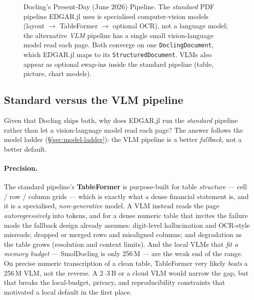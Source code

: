 \documentclass[11pt,a4paper]{report}
\begin{document}
\begin{figure}[th]
\caption{Docling's Present-Day (June 2026) Pipeline. The \emph{standard} PDF pipeline EDGAR.jl uses is
specialised computer-vision models (layout $\to$ TableFormer $\to$ optional OCR), not a language model; the
alternative \emph{VLM} pipeline has a single small vision-language model read each page. Both converge on one
\texttt{DoclingDocument}, which EDGAR.jl maps to its \texttt{StructuredDocument}. VLMs also appear as optional
swap-ins inside the standard pipeline (table, picture, chart models).}
\label{fig:docling-pipeline}
\end{figure}

\subsection{Standard versus the VLM pipeline}
\label{sec:pdf-standard-vs-vlm}

Given that Docling ships both, why does EDGAR.jl run the \emph{standard} pipeline rather than let a
vision-language model read each page? The answer follows the model ladder (\S\ref{sec:model-ladder}): the VLM
pipeline is a better \emph{fallback}, not a better default.

\paragraph{Precision.} The standard pipeline's \textbf{TableFormer} is purpose-built for table \emph{structure}
--- cell / row / column grids --- which is exactly what a dense financial statement is, and it is a
specialised, \emph{non-generative} model. A VLM instead reads the page \emph{autoregressively} into tokens, and
for a dense numeric table that invites the failure mode the fallback design already assumes: digit-level
hallucination and OCR-style misreads; dropped or merged rows and misaligned columns; and degradation as the
table grows (resolution and context limits). And the local VLMs that \emph{fit a memory budget} ---
SmolDocling is only 256\,M --- are the weak end of the range. On precise numeric transcription of a clean
table, TableFormer very likely \emph{beats} a 256\,M VLM, not the reverse. A 2--3\,B or a cloud VLM would
narrow the gap, but that breaks the local-budget, privacy, and reproducibility constraints that motivated a
local default in the first place.
\end{document}
